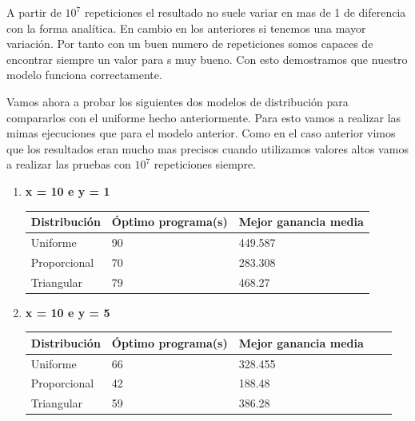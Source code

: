 \documentclass[]{article}
\begin{document}
A partir de $10^{7}$ repeticiones el resultado no suele variar en mas de 1 de diferencia con la forma analítica. En cambio en los anteriores si tenemos una mayor variación. Por tanto con un buen numero de repeticiones somos capaces de encontrar siempre un valor para s muy bueno. Con esto demostramos que nuestro modelo funciona correctamente.


Vamos ahora a probar los siguientes dos modelos de distribución para compararlos con el uniforme hecho anteriormente. Para esto vamos a realizar las mimas ejecuciones que para el modelo anterior. Como en el caso anterior vimos que los resultados eran mucho mas precisos cuando utilizamos valores altos vamos a realizar las pruebas con $10^{7}$ repeticiones siempre.

\begin{enumerate}
	\item \textbf{ x = 10 e y = 1}
	\begin{table}[H]
		\begin{center}

				\begin{tabular}{|l|l|l|}
					
					\hline
					Distribución & Óptimo programa(s) & Mejor ganancia media\\
					\hline \hline
					Uniforme &90 & 449.587
					\\ \hline
					Proporcional & 70 & 283.308
					\\ \hline
					Triangular & 79 & 468.27
					\\ \hline
					
				\end{tabular}
			
			\label{tabla:sencilla}
		\end{center}
	\end{table}
	\item \textbf{ x = 10 e y = 5}
	\begin{table}[H]
		\begin{center}
				\begin{tabular}{|l|l|l|l|l|}
					
					\hline
					 Distribución & Óptimo programa(s) & Mejor ganancia media\\
					\hline \hline
					Uniforme & 66 & 328.455
					\\ \hline
					Proporcional & 42 &  188.48
					\\ \hline
					Triangular & 59 & 386.28
					\\ \hline
					

\end{tabular}
\end{center}
\end{table}
\end{enumerate}
\end{document}
